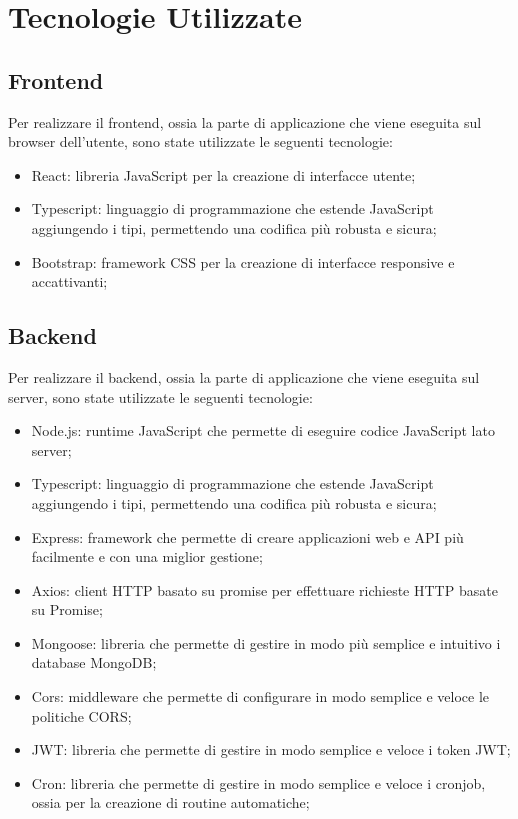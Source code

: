 \documentclass[a4paper, 11pt]{article}
\begin{document}
\newpage
\section{Tecnologie Utilizzate}
\subsection{Frontend}
Per realizzare il frontend, ossia la parte di applicazione che viene eseguita sul browser dell'utente, sono state utilizzate le seguenti tecnologie:
\begin{itemize}
    \item React: libreria JavaScript per la creazione di interfacce utente;
    \item Typescript: linguaggio di programmazione che estende JavaScript aggiungendo i tipi, permettendo una codifica più robusta e sicura;
    \item Bootstrap: framework CSS per la creazione di interfacce responsive e accattivanti;
\end{itemize}
\subsection{Backend}
Per realizzare il backend, ossia la parte di applicazione che viene eseguita sul server, sono state utilizzate le seguenti tecnologie:
\begin{itemize}
    \item Node.js: runtime JavaScript che permette di eseguire codice JavaScript lato server;
    \item Typescript: linguaggio di programmazione che estende JavaScript aggiungendo i tipi, permettendo una codifica più robusta e sicura;
    \item Express: framework che permette di creare applicazioni web e API più facilmente e con una miglior gestione;
    \item Axios: client HTTP basato su promise per effettuare richieste HTTP basate su Promise;
    \item Mongoose: libreria che permette di gestire in modo più semplice e intuitivo i database MongoDB;
    \item Cors: middleware che permette di configurare in modo semplice e veloce le politiche CORS;
    \item JWT: libreria che permette di gestire in modo semplice e veloce i token JWT;
    \item Cron: libreria che permette di gestire in modo semplice e veloce i cronjob, ossia per la creazione di routine automatiche;
\end{itemize}
\end{document}

